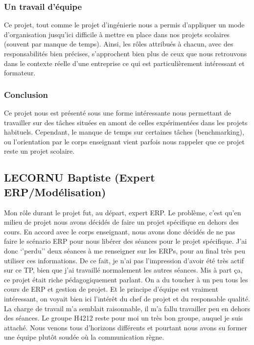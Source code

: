         \subsubsection{Un travail d’équipe}
        Ce projet, tout comme le projet d’ingénierie nous a permis d’appliquer un mode d’organisation jusqu'ici difficile à mettre en place dans nos projets scolaires (souvent par manque de temps). Ainsi, les rôles attribués à chacun, avec des responsabilités bien précises, s’approchent bien plus de ceux que nous retrouvons dans le contexte réelle d’une entreprise ce qui est particulièrement intéressant et formateur.

        \subsubsection{Conclusion}
        Ce projet nous est présenté sous une forme intéressante nous permettant de travailler sur des tâches situées en amont de celles expérimentées dans les projets habituels. Cependant, le manque de temps sur certaines tâches (benchmarking), ou l’orientation par le corps enseignant vient parfois nous rappeler que ce projet reste un projet scolaire.


    \subsection{LECORNU Baptiste (Expert ERP/Modélisation)}
        Mon rôle durant le projet fut, au départ, expert ERP. Le problème, c’est qu’en milieu de projet nous avons décidés de faire un projet spécifique en dehors des cours. En accord avec le corps enseignant, nous avons donc décidés de ne pas faire le scénario ERP pour nous libérer des séances pour le projet spécifique. J’ai donc ‘’perdu’’ deux séances à me renseigner sur les ERPs, pour au final très peu utiliser ces informations. De ce fait, je n’ai pas l’impression d’avoir été très actif sur ce TP, bien que j’ai travaillé normalement les autres séances. 
        Mis à part ça, ce projet était riche pédagogiquement parlant. On a du toucher à un peu tous les cours de ERP et gestion de projet. Et le principe d’équipe est vraiment intéressant, on voyait bien ici l’intérêt du chef de projet et du responsable qualité.
        La charge de travail m’a semblait raisonnable, il m’a fallu travailler peu en dehors des séances.
        Le groupe H4212 reste pour moi un très bon groupe, auquel je suis attaché. Nous venons tous d’horizons différents et pourtant nous avons su former une équipe plutôt soudée où la communication règne.

